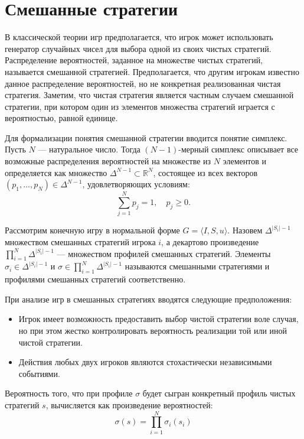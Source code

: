 \section{Смешанные стратегии}

В классической теории игр предполагается, что игрок может использовать генератор случайных чисел для выбора одной из своих чистых стратегий. Распределение вероятностей, заданное на множестве чистых стратегий, называется смешанной стратегией. Предполагается, что другим игрокам известно данное распределение вероятностей, но не конкретная реализованная чистая стратегия. Заметим, что чистая стратегия является частным случаем смешанной стратегии, при котором один из элементов множества стратегий играется с вероятностью, равной единице.

Для формализации понятия смешанной стратегии вводится понятие симплекс. Пусть $N$ — натуральное число. Тогда $(N-1)$-мерный симплекс описывает все возможные распределения вероятностей на множестве из $N$ элементов и определяется как множество $\Delta^{N-1} \subset \mathbb{R}^N$, состоящее из всех векторов $(p_1, \dots, p_N) \in \Delta^{N-1}$, удовлетворяющих условиям:
\begin{equation}
    \sum_{j=1}^N p_j = 1, \quad p_j \ge 0.
\end{equation}

Рассмотрим конечную игру в нормальной форме $G = \langle I, S, u \rangle$. Назовем $\Delta^{|S_i|-1}$ множеством смешанных стратегий игрока $i$, а декартово произведение $\prod_{i=1}^N \Delta^{|S_i|-1}$ — множеством профилей смешанных стратегий. Элементы $\sigma_i \in \Delta^{|S_i|-1}$ и $\sigma \in \prod_{i=1}^N \Delta^{|S_i|-1}$ называются смешанными стратегиями и профилями смешанных стратегий соответственно. 

При анализе игр в смешанных стратегиях вводятся следующие предположения:
\begin{itemize}
    \item Игрок имеет возможность предоставить выбор чистой стратегии воле случая, но при этом жестко контролировать вероятность реализации той или иной чистой стратегии.
    \item Действия любых двух игроков являются стохастически независимыми событиями.
\end{itemize}

Вероятность того, что при профиле $\sigma$ будет сыгран конкретный профиль чистых стратегий $s$, вычисляется как произведение вероятностей:
\begin{equation}
    \sigma(s) = \prod_{i=1}^N \sigma_i(s_i)
\end{equation}

